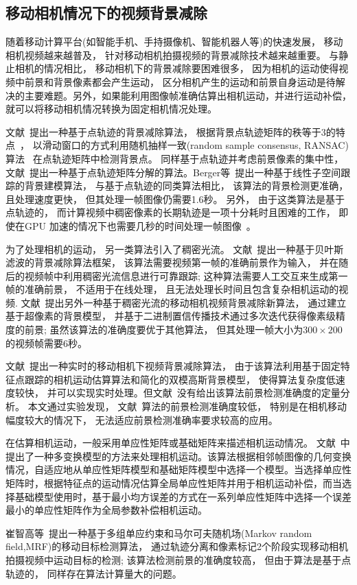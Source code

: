 \subsection{移动相机情况下的视频背景减除}
\label{sec:movingCamera}
随着移动计算平台(如智能手机、手持摄像机、智能机器人等)的快速发展， 移动相机视频越来越普及， 针对移动相机拍摄视频的背景减除技术越来越重要。 与静止相机的情况相比， 移动相机下的背景减除要困难很多， 因为相机的运动使得视频中前景和背景像素都会产生运动， 区分相机产生的运动和前景自身运动是待解决的主要难题。另外，如果能利用图像帧准确估算出相机运动，并进行运动补偿，就可以将移动相机情况转换为固定相机情况处理。\par
 文献~提出一种基于点轨迹的背景减除算法， 根据背景点轨迹矩阵的秩等于3的特点~\cite{Tomasi_1992}， 以滑动窗口的方式利用随机抽样一致(random sample consensus, RANSAC) 算法~\cite{Ransac} 在点轨迹矩阵中检测背景点。 同样基于点轨迹并考虑前景像素的集中性， 文献~\cite{Cui2012}提出一种基于点轨迹矩阵分解的算法。Berger等~\cite{SubspaceTracking}提出一种基于线性子空间跟踪的背景建模算法， 与基于点轨迹的同类算法相比， 该算法的背景检测更准确， 且处理速度更快， 但其处理一帧图像仍需要1.6秒。 另外， 由于这类算法是基于点轨迹的， 而计算视频中稠密像素的长期轨迹是一项十分耗时且困难的工作， 即使在GPU 加速的情况下也需要几秒的时间处理一帧图像~\cite{ECCV10DensePonintTrajectories}。\par

为了处理相机的运动， 另一类算法引入了稠密光流。 文献~\cite{kwak2011Generalized}提出一种基于贝叶斯滤波的背景减除算法框架， 该算法需要视频第一帧的准确前景作为输入， 并在随后的视频帧中利用稠密光流信息进行可靠跟踪; 这种算法需要人工交互来生成第一帧的准确前景， 不适用于在线处理， 且无法处理长时间且包含复杂相机运动的视频. 文献~\cite{gbsuperpixel}提出另外一种基于稠密光流的移动相机视频背景减除新算法， 通过建立基于超像素的背景模型， 并基于二进制置信传播技术通过多次迭代获得像素级精度的前景; 虽然该算法的准确度要优于其他算法， 但其处理一帧大小为$300\times200$的视频帧需要6秒。\par
文献~\cite{5.8s}提出一种实时的移动相机下视频背景减除算法， 由于该算法利用基于固定特征点跟踪的相机运动估算算法和简化的双模高斯背景模型， 使得算法复杂度低速度较快， 并可以实现实时处理。但文献~\cite{5.8s}没有给出该算法前景检测准确度的定量分析。 本文通过实验发现， 文献~\cite{5.8s}算法的前景检测准确度较低， 特别是在相机移动幅度较大的情况下， 无法适应前景检测准确率要求较高的应用。\par
在估算相机运动，一般采用单应性矩阵或基础矩阵来描述相机运动情况。 文献~中提出了一种多变换模型的方法来处理相机运动。该算法根据相邻帧图像的几何变换情况，自适应地从单应性矩阵模型和基础矩阵模型中选择一个模型。当选择单应性矩阵时，根据特征点的运动情况估算全局单应性矩阵并用于相机运动补偿，而当选择基础模型使用时，基于最小均方误差的方式在一系列单应性矩阵中选择一个误差最小的单应性矩阵作为全局参数补偿相机运动。\par
崔智高等~\cite{czg}提出一种基于多组单应约束和马尔可夫随机场(Markov random field,MRF)的移动目标检测算法， 通过轨迹分离和像素标记2个阶段实现移动相机拍摄视频中运动目标的检测; 该算法检测前景的准确度较高， 但由于算法是基于点轨迹的， 同样存在算法计算量大的问题。



